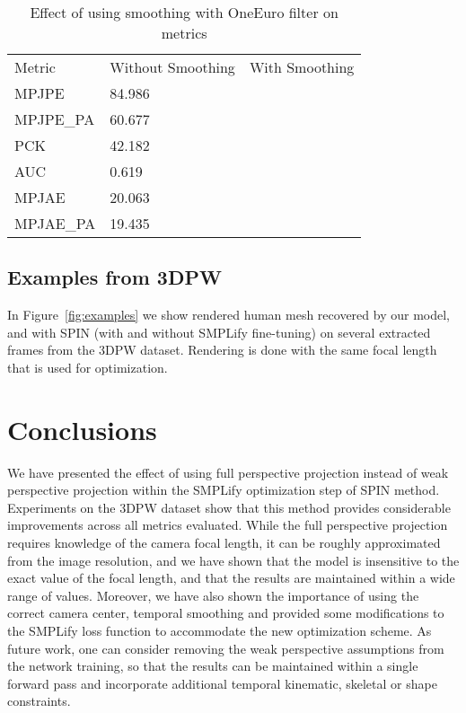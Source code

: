 \documentclass[runningheads]{llncs}
\begin{document}
\vspace{-20pt}
\setlength{\tabcolsep}{4pt}
\begin{table}
	\begin{center}
		\caption{Effect of using smoothing with OneEuro filter on metrics}
		\label{table:smoothing}
		\begin{tabular}{lll}
			\hline\noalign{\smallskip}
			Metric & Without Smoothing & With Smoothing\\
			\noalign{\smallskip}
			\hline
			\noalign{\smallskip}
			MPJPE  & 84.986 & \\
			{MPJPE\_PA} & 60.677 & \\
			PCK & 42.182 & \\
			AUC & 0.619 & \\
			MPJAE & 20.063 & \\
			{MPJAE\_PA} & 19.435 & \\
			\hline
		\end{tabular}
	\end{center}
\end{table}
\setlength{\tabcolsep}{1.4pt}


\subsection{Examples from 3DPW}

In Figure~\ref{fig:examples} we show rendered human mesh recovered by our model, and with SPIN (with and without SMPLify fine-tuning) on several extracted frames from the 3DPW dataset. Rendering is done with the same focal length that is used for optimization.


\section{Conclusions}

We have presented the effect of using full perspective projection instead of weak perspective projection within the SMPLify optimization step of SPIN method. Experiments on the 3DPW dataset show that this method provides considerable improvements across all metrics evaluated. While the full perspective projection requires knowledge of the camera focal length, it can be roughly approximated from the image resolution, and we have shown that the model is insensitive to the exact value of the focal length, and that the results are maintained within a wide range of values. Moreover, we have also shown the importance of using the correct camera center, temporal smoothing and provided some modifications to the SMPLify loss function to accommodate the new optimization scheme. As future work, one can consider removing the weak perspective assumptions from the network training, so that the results can be maintained within a single forward pass and incorporate additional temporal kinematic, skeletal or shape constraints.
\end{document}
